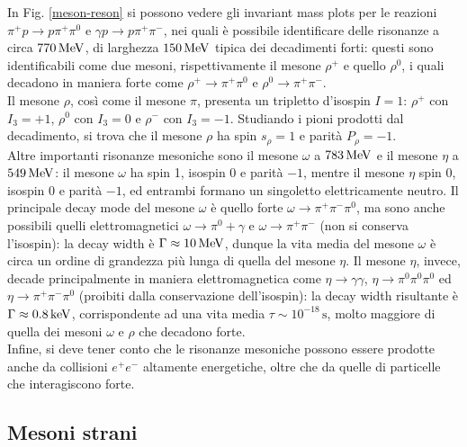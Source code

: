 In Fig. \ref{meson-reson} si possono vedere gli invariant mass plots per le reazioni $ \pi^+ p \rightarrow p \pi^+ \pi^0 $ e $ \gamma p \rightarrow p \pi^+ \pi^- $, nei quali è possibile identificare delle risonanze a circa $ 770\,\mathrm{MeV} $, di larghezza $ 150\,\mathrm{MeV} $ tipica dei decadimenti forti: questi sono identificabili come due mesoni, rispettivamente il mesone $ \rho^+ $ e quello $ \rho^0 $, i quali decadono in maniera forte come $ \rho^+ \rightarrow \pi^+ \pi^0 $ e $ \rho^0 \rightarrow \pi^+ \pi^- $.\\
Il mesone $ \rho $, così come il mesone $ \pi $, presenta un tripletto d'isospin $ I = 1 $: $ \rho^+ $ con $ I_3 = +1 $, $ \rho^0 $ con $ I_3 = 0 $ e $ \rho^- $ con $ I_3 = -1 $. Studiando i pioni prodotti dal decadimento, si trova che il mesone $ \rho $ ha spin $ s_{\rho} = 1 $ e parità $ P_{\rho} = -1 $.\\
Altre importanti risonanze mesoniche sono il mesone $ \omega $ a $ 783\,\mathrm{MeV} $ e il mesone $ \eta $ a $ 549\,\mathrm{MeV} $: il mesone $ \omega $ ha spin 1, isospin 0 e parità $ -1 $, mentre il mesone $ \eta $ spin 0, isospin 0 e parità $ -1 $, ed entrambi formano un singoletto elettricamente neutro. Il principale decay mode del mesone $ \omega $ è quello forte $ \omega \rightarrow \pi^+ \pi^- \pi^0 $, ma sono anche possibili quelli elettromagnetici $ \omega \rightarrow \pi^0 + \gamma $ e $ \omega \rightarrow \pi^+ \pi^- $ (non si conserva l'isospin): la decay width è $ \Gamma \approx 10\,\mathrm{MeV} $, dunque la vita media del mesone $ \omega $ è circa un ordine di grandezza più lunga di quella del mesone $ \eta $. Il mesone $ \eta $, invece, decade principalmente in maniera elettromagnetica come $ \eta \rightarrow \gamma \gamma $, $ \eta \rightarrow \pi^0 \pi^0 \pi^0 $ ed $ \eta \rightarrow \pi^+ \pi^- \pi^0 $ (proibiti dalla conservazione dell'isospin): la decay width risultante è $ \Gamma \approx 0.8\,\mathrm{keV} $, corrispondente ad una vita media $ \tau \sim 10^{-18} \,\text{s} $, molto maggiore di quella dei mesoni $ \omega $ e $ \rho $ che decadono forte.\\
Infine, si deve tener conto che le risonanze mesoniche possono essere prodotte anche da collisioni $ e^+ e^- $ altamente energetiche, oltre che da quelle di particelle che interagiscono forte.

\subsection{Mesoni strani}


